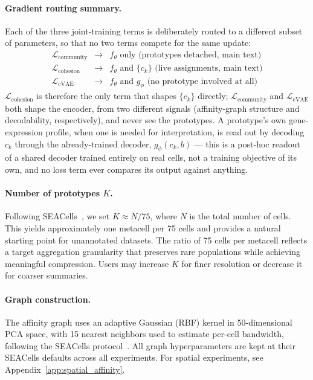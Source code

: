\paragraph{Gradient routing summary.}
Each of the three joint-training terms is deliberately routed to a different subset of parameters, so that no two terms compete for the same update:
\begin{equation}
\begin{array}{lll}
\mathcal{L}_{\text{community}} & \to & f_\theta \text{ only (prototypes detached, main text)} \\
\mathcal{L}_{\text{cohesion}}  & \to & f_\theta \text{ and } \{c_k\} \text{ (live assignments, main text)} \\
\mathcal{L}_{\text{cVAE}}      & \to & f_\theta \text{ and } g_\phi \text{ (no prototype involved at all)}
\end{array}
\end{equation}
$\mathcal{L}_{\text{cohesion}}$ is therefore the only term that shapes $\{c_k\}$ directly; $\mathcal{L}_{\text{community}}$ and $\mathcal{L}_{\text{cVAE}}$ both shape the encoder, from two different signals (affinity-graph structure and decodability, respectively), and never see the prototypes. A prototype's own gene-expression profile, when one is needed for interpretation, is read out by decoding $c_k$ through the already-trained decoder, $g_\phi(c_k, b)$ --- this is a post-hoc readout of a shared decoder trained entirely on real cells, not a training objective of its own, and no loss term ever compares its output against anything.

\paragraph{Number of prototypes $K$.}
Following SEACells~\citep{seacells}, we set $K \approx N / 75$, where $N$ is the total number of cells.
This yields approximately one metacell per 75 cells and provides a natural starting point for unannotated datasets.
The ratio of 75 cells per metacell reflects a target aggregation granularity that preserves rare populations while achieving meaningful compression.
Users may increase $K$ for finer resolution or decrease it for coarser summaries.

\paragraph{Graph construction.}
The affinity graph uses an adaptive Gaussian (RBF) kernel in 50-dimensional PCA space, with 15 nearest neighbors used to estimate per-cell bandwidth, following the SEACells protocol~\citep{seacells}.
All graph hyperparameters are kept at their SEACells defaults across all experiments.
For spatial experiments, see Appendix~\ref{app:spatial_affinity}.

